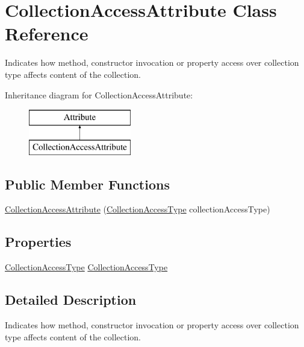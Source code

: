 \hypertarget{class_collection_access_attribute}{}\section{Collection\+Access\+Attribute Class Reference}
\label{class_collection_access_attribute}


Indicates how method, constructor invocation or property access over collection type affects content of the collection.  


Inheritance diagram for Collection\+Access\+Attribute\+:\begin{figure}[H]
\begin{center}
\leavevmode
\includegraphics[height=2.000000cm]{class_collection_access_attribute}
\end{center}
\end{figure}
\subsection*{Public Member Functions}
\begin{DoxyCompactItemize}
\item 
\mbox{\hyperlink{class_collection_access_attribute_a14445128bbc836c5876b84ac71307e91}{Collection\+Access\+Attribute}} (\mbox{\hyperlink{_annotations_8cs_ac934271c5bff522bfe4934d1e7be46a8}{Collection\+Access\+Type}} collection\+Access\+Type)
\end{DoxyCompactItemize}
\subsection*{Properties}
\begin{DoxyCompactItemize}
\item 
\mbox{\hyperlink{_annotations_8cs_ac934271c5bff522bfe4934d1e7be46a8}{Collection\+Access\+Type}} \mbox{\hyperlink{class_collection_access_attribute_a6f4227ee9e50c5103d73637cef1a3a9e}{Collection\+Access\+Type}}
\end{DoxyCompactItemize}


\subsection{Detailed Description}
Indicates how method, constructor invocation or property access over collection type affects content of the collection. 



